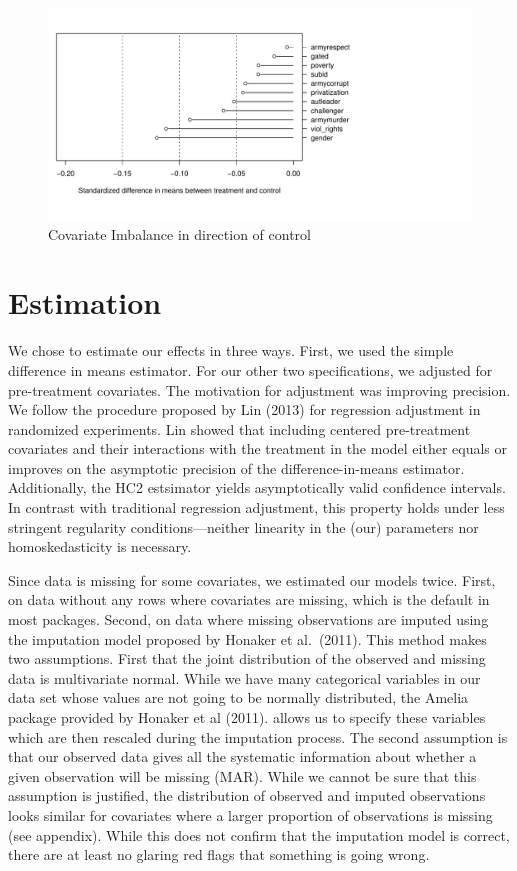 \documentclass[
  12pt,
]{article}
\begin{document}
\begin{figure}
\centering
\includegraphics{marko-oliver_final-proj_files/figure-latex/unnamed-chunk-5-1.pdf}
\caption{Covariate Imbalance in direction of control}
\end{figure}

\hypertarget{estimation}{%
\section{Estimation}\label{estimation}}

We chose to estimate our effects in three ways. First, we used the
simple difference in means estimator. For our other two specifications,
we adjusted for pre-treatment covariates. The motivation for adjustment
was improving precision. We follow the procedure proposed by Lin (2013)
for regression adjustment in randomized experiments. Lin showed that
including centered pre-treatment covariates and their interactions with
the treatment in the model either equals or improves on the asymptotic
precision of the difference-in-means estimator. Additionally, the HC2
estsimator yields asymptotically valid confidence intervals. In contrast
with traditional regression adjustment, this property holds under less
stringent regularity conditions---neither linearity in the (our)
parameters nor homoskedasticity is necessary.

Since data is missing for some covariates, we estimated our models
twice. First, on data without any rows where covariates are missing,
which is the default in most packages. Second, on data where missing
observations are imputed using the imputation model proposed by Honaker
et al.~(2011). This method makes two assumptions. First that the joint
distribution of the observed and missing data is multivariate normal.
While we have many categorical variables in our data set whose values
are not going to be normally distributed, the Amelia package provided by
Honaker et al (2011). allows us to specify these variables which are
then rescaled during the imputation process. The second assumption is
that our observed data gives all the systematic information about
whether a given observation will be missing (MAR). While we cannot be
sure that this assumption is justified, the distribution of observed and
imputed observations looks similar for covariates where a larger
proportion of observations is missing (see appendix). While this does
not confirm that the imputation model is correct, there are at least no
glaring red flags that something is going wrong.
\end{document}
